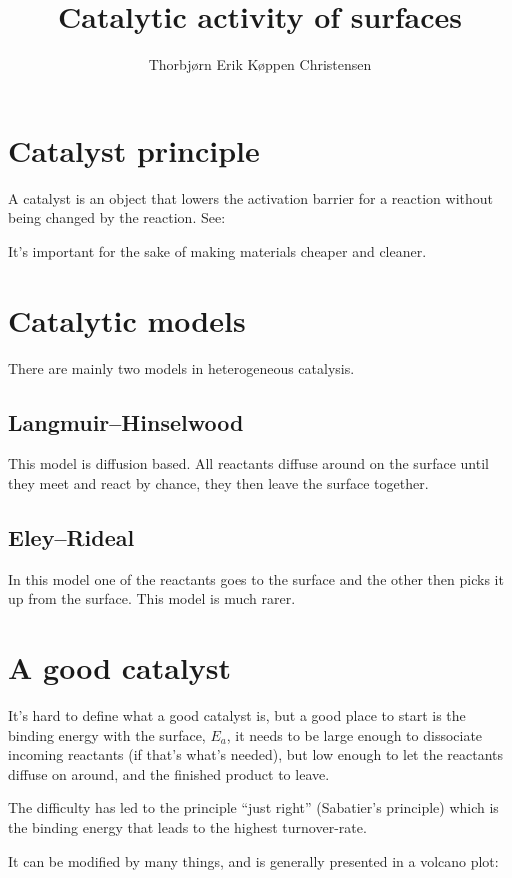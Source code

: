 \documentclass[article,oneside]{memoir}
\title{Catalytic activity of surfaces}
\author{Thorbjørn Erik Køppen Christensen}
\begin{document}
\maketitle

\chapter{Catalyst principle}
A catalyst is an object that lowers the activation barrier for a reaction without being changed by the reaction. See:


It's important for the sake of making materials cheaper and cleaner.
\chapter{Catalytic models}
There are mainly two models in heterogeneous catalysis.
\section{Langmuir--Hinselwood}
This model is diffusion based. All reactants diffuse around on the surface until they meet and react by chance, they then leave the surface together.

\section{Eley--Rideal}
In this model one of the reactants goes to the surface and the other then picks it up from the surface. This model is much rarer.

\chapter{A good catalyst}
It's hard to define what a good catalyst is, but a good place to start is the binding energy with the surface, $E_{a}$, it needs to be large enough to dissociate incoming reactants (if that's what's needed), but low enough to let the reactants diffuse on around, and the finished product to leave. 

The difficulty has led to the principle ``just right'' (Sabatier's principle) which is the binding energy that leads to the highest turnover-rate.

It can be modified by many things, and is generally presented in a volcano plot:
\end{document}
